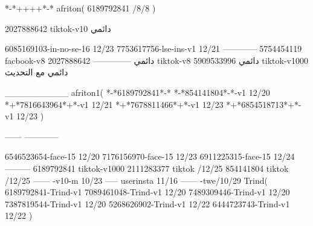 *-*++++*-*
afriton(
6189792841 /8/8
)

2027888642 tiktok-v10
دائمي

6085169103-in-no-se-16 12/23
7753617756-lse-ins-v1 12/21
------------
5754454119 facbook-v8
دائمي
--------------
2027888642 tiktok-v8
دائمي
5909533996 tiktok-v1000
دائمي مع التحديث

__________
afriton1(
*-*6189792841*-*
*-*854141804*-*-v1 12/20
*+*7816643964*+*-v1 12/21
*+*7678811466*+*-v1 12/23
*+*6854518713*+*-v1 12/23
)

------
------------


6546523654-face-15 12/20
7176156970-face-15 12/23
6911225315-face-15 12/24
---------
6189792841 tiktok-v1000
2111283377 tiktok /12/25
854141804 tiktok /12/25
------
-v10-m 10/23
-----
userinsta 11/16
------
-twe/10/29
Trind(
6189792841-Trind-v1 
7089461048-Trind-v1 12/20
7489309446-Trind-v1 12/20
7387819544-Trind-v1 12/20
5268626902-Trind-v1 12/22
6444723743-Trind-v1 12/22
)
